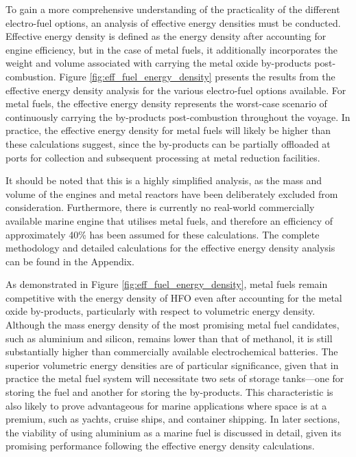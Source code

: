 \documentclass[12pt]{article}
\begin{document}
To gain a more comprehensive understanding of the practicality of the different electro-fuel options, an analysis of effective energy densities must be conducted. Effective energy density is defined as the energy density after accounting for engine efficiency, but in the case of metal fuels, it additionally incorporates the weight and volume associated with carrying the metal oxide by-products post-combustion. Figure \ref{fig:eff_fuel_energy_density} presents the results from the effective energy density analysis for the various electro-fuel options available. For metal fuels, the effective energy density represents the worst-case scenario of continuously carrying the by-products post-combustion throughout the voyage. In practice, the effective energy density for metal fuels will likely be higher than these calculations suggest, since the by-products can be partially offloaded at ports for collection and subsequent processing at metal reduction facilities.

It should be noted that this is a highly simplified analysis, as the mass and volume of the engines and metal reactors have been deliberately excluded from consideration. Furthermore, there is currently no real-world commercially available marine engine that utilises metal fuels, and therefore an efficiency of approximately 40\% has been assumed for these calculations. The complete methodology and detailed calculations for the effective energy density analysis can be found in the Appendix.

As demonstrated in Figure \ref{fig:eff_fuel_energy_density}, metal fuels remain competitive with the energy density of HFO even after accounting for the metal oxide by-products, particularly with respect to volumetric energy density. Although the mass energy density of the most promising metal fuel candidates, such as aluminium and silicon, remains lower than that of methanol, it is still substantially higher than commercially available electrochemical batteries. The superior volumetric energy densities are of particular significance, given that in practice the metal fuel system will necessitate two sets of storage tanks—one for storing the fuel and another for storing the by-products. This characteristic is also likely to prove advantageous for marine applications where space is at a premium, such as yachts, cruise ships, and container shipping. In later sections, the viability of using aluminium as a marine fuel is discussed in detail, given its promising performance following the effective energy density calculations.
\end{document}
